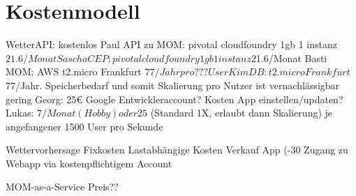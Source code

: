 \section{Kostenmodell}

WetterAPI: kostenlos
Paul API zu MOM: pivotal cloudfoundry 1gb 1 instanz $21.6/Monat
Sascha CEP: pivotal cloudfoundry 1gb 1 instanz $21.6/Monat
Basti MOM: AWS t2.micro Frankfurt $77/Jahr pro ??? User
Kim DB: t2.micro Frankfurt $77/Jahr. Speicherbedarf und somit Skalierung pro Nutzer ist vernachlässigbar gering 
Georg: 25€ Google Entwickleraccount? Kosten App einstellen/updaten?
Lukas: $7/Monat (Hobby) oder 25$ (Standard 1X, erlaubt dann Skalierung) je angefangener 1500 User pro Sekunde


Wettervorhersage
Fixkosten
Lastabhängige Kosten
Verkauf App (-30%
Zugang zu Webapp via kostenpflichtigem Account

MOM-as-a-Service
Preis?? 